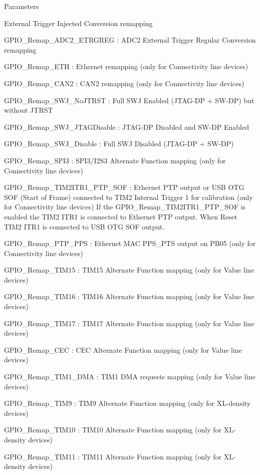 \begin{DoxyParams}{Parameters}
\begin{DoxyItemize}
External Trigger Injected Conversion remapping \item G\-P\-I\-O\-\_\-\-Remap\-\_\-\-A\-D\-C2\-\_\-\-E\-T\-R\-G\-R\-E\-G \-: A\-D\-C2 External Trigger Regular Conversion remapping \item G\-P\-I\-O\-\_\-\-Remap\-\_\-\-E\-T\-H \-: Ethernet remapping (only for Connectivity line devices) \item G\-P\-I\-O\-\_\-\-Remap\-\_\-\-C\-A\-N2 \-: C\-A\-N2 remapping (only for Connectivity line devices) \item G\-P\-I\-O\-\_\-\-Remap\-\_\-\-S\-W\-J\-\_\-\-No\-J\-T\-R\-S\-T \-: Full S\-W\-J Enabled (J\-T\-A\-G-\/\-D\-P + S\-W-\/\-D\-P) but without J\-T\-R\-S\-T \item G\-P\-I\-O\-\_\-\-Remap\-\_\-\-S\-W\-J\-\_\-\-J\-T\-A\-G\-Disable \-: J\-T\-A\-G-\/\-D\-P Disabled and S\-W-\/\-D\-P Enabled \item G\-P\-I\-O\-\_\-\-Remap\-\_\-\-S\-W\-J\-\_\-\-Disable \-: Full S\-W\-J Disabled (J\-T\-A\-G-\/\-D\-P + S\-W-\/\-D\-P) \item G\-P\-I\-O\-\_\-\-Remap\-\_\-\-S\-P\-I3 \-: S\-P\-I3/\-I2\-S3 Alternate Function mapping (only for Connectivity line devices) \item G\-P\-I\-O\-\_\-\-Remap\-\_\-\-T\-I\-M2\-I\-T\-R1\-\_\-\-P\-T\-P\-\_\-\-S\-O\-F \-: Ethernet P\-T\-P output or U\-S\-B O\-T\-G S\-O\-F (Start of Frame) connected to T\-I\-M2 Internal Trigger 1 for calibration (only for Connectivity line devices) If the G\-P\-I\-O\-\_\-\-Remap\-\_\-\-T\-I\-M2\-I\-T\-R1\-\_\-\-P\-T\-P\-\_\-\-S\-O\-F is enabled the T\-I\-M2 I\-T\-R1 is connected to Ethernet P\-T\-P output. When Reset T\-I\-M2 I\-T\-R1 is connected to U\-S\-B O\-T\-G S\-O\-F output. \item G\-P\-I\-O\-\_\-\-Remap\-\_\-\-P\-T\-P\-\_\-\-P\-P\-S \-: Ethernet M\-A\-C P\-P\-S\-\_\-\-P\-T\-S output on P\-B05 (only for Connectivity line devices) \item G\-P\-I\-O\-\_\-\-Remap\-\_\-\-T\-I\-M15 \-: T\-I\-M15 Alternate Function mapping (only for Value line devices) \item G\-P\-I\-O\-\_\-\-Remap\-\_\-\-T\-I\-M16 \-: T\-I\-M16 Alternate Function mapping (only for Value line devices) \item G\-P\-I\-O\-\_\-\-Remap\-\_\-\-T\-I\-M17 \-: T\-I\-M17 Alternate Function mapping (only for Value line devices) \item G\-P\-I\-O\-\_\-\-Remap\-\_\-\-C\-E\-C \-: C\-E\-C Alternate Function mapping (only for Value line devices) \item G\-P\-I\-O\-\_\-\-Remap\-\_\-\-T\-I\-M1\-\_\-\-D\-M\-A \-: T\-I\-M1 D\-M\-A requests mapping (only for Value line devices) \item G\-P\-I\-O\-\_\-\-Remap\-\_\-\-T\-I\-M9 \-: T\-I\-M9 Alternate Function mapping (only for X\-L-\/density devices) \item G\-P\-I\-O\-\_\-\-Remap\-\_\-\-T\-I\-M10 \-: T\-I\-M10 Alternate Function mapping (only for X\-L-\/density devices) \item G\-P\-I\-O\-\_\-\-Remap\-\_\-\-T\-I\-M11 \-: T\-I\-M11 Alternate Function mapping (only for X\-L-\/density devices) \item 
\end{DoxyItemize}
\end{DoxyParams}
